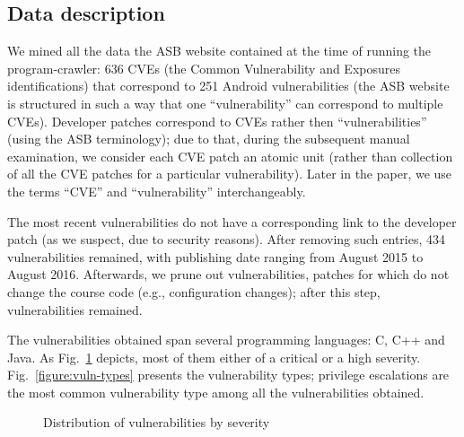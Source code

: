 \subsection{Data description}

We mined all the data the ASB website contained at the time of running the program-crawler: 636 CVEs (the Common Vulnerability and Exposures identifications) that correspond to 251 Android vulnerabilities (the ASB website is structured in such a way that one ``vulnerability'' can correspond to multiple CVEs). Developer patches correspond to CVEs rather then ``vulnerabilities'' (using the ASB terminology); due to that, during the subsequent manual examination, we consider each CVE patch an atomic unit (rather than collection of all the CVE patches for a particular vulnerability). Later in the paper, we use the terms ``CVE'' and ``vulnerability'' interchangeably. %

The most recent vulnerabilities do not have a corresponding link to the developer patch (as we suspect, due to security reasons). After removing such entries, 434 vulnerabilities remained, with publishing date ranging from August 2015 to August 2016. Afterwards, we prune out vulnerabilities, patches for which do not change the course code (e.g., configuration changes); after this step, \numvuln vulnerabilities remained.

The vulnerabilities obtained span several programming languages: C, C++ and Java. As Fig.~\ref{figure:severity} depicts, most of them either of a critical or a high severity. Fig.~\ref{figure:vuln-types} presents the vulnerability types; privilege escalations are the most common vulnerability type among all the vulnerabilities obtained.

\begin{figure}
    \small \caption{Distribution of vulnerabilities by severity}
        \label{figure:severity}
\end{figure}

